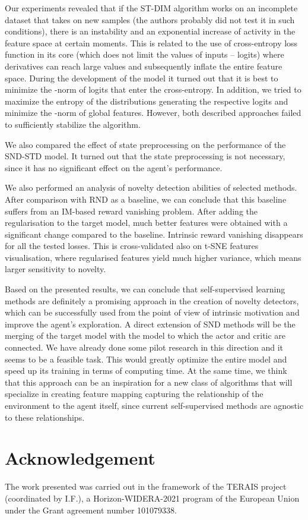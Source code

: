 \documentclass[a4paper,11pt]{elsarticle}
\begin{document}
Our experiments revealed that if the ST-DIM algorithm works on an incomplete dataset that takes on new samples (the authors probably did not test it in such conditions), there is an instability and an exponential increase of activity in the feature space at certain moments. This is related to the use of cross-entropy loss function in its core (which does not limit the values of inputs -- logits) where derivatives can reach large values and subsequently inflate the entire feature space. During the development of the model it turned out that it is best to minimize the -norm of logits that enter the cross-entropy. In addition, we tried to maximize the entropy of the distributions generating the respective logits and minimize the -norm of global features. However, both described approaches failed to sufficiently stabilize the algorithm.

We also compared the effect of state preprocessing on the performance of the SND-STD model. It turned out that the state preprocessing is not necessary, since it has no significant effect on the agent's performance.

We also performed an analysis of novelty detection abilities of selected methods. After comparison with RND as a baseline, we can conclude that this baseline suffers from an IM-based reward vanishing problem. After adding the regularisation to the target model, much better features were obtained with a significant change compared to the baseline. Intrinsic reward vanishing disappears for all the tested losses. This is cross-validated also on t-SNE features visualisation, where regularised features yield much higher variance, which means larger sensitivity to novelty.

Based on the presented results, we can conclude that self-supervised learning methods are definitely a promising approach in the creation of novelty detectors, which can be successfully used from the point of view of intrinsic motivation and improve the agent's exploration. A direct extension of SND methods will be the merging of the target model with the model to which the actor and critic are connected. We have already done some pilot research in this direction and it seems to be a feasible task. This would greatly optimize the entire model and speed up its training in terms of computing time.
At the same time, we think that this approach can be an inspiration for a new class of algorithms that will specialize in creating feature mapping capturing the relationship of the environment to the agent itself, since current self-supervised methods are agnostic to these relationships.

\section*{Acknowledgement}

\noindent
The work presented was carried out in the framework of the TERAIS project (coordinated by I.F.), a Horizon-WIDERA-2021 program of the European Union under the Grant agreement number 101079338.
\vspace{3,16314mm}
  
 
\end{document}

